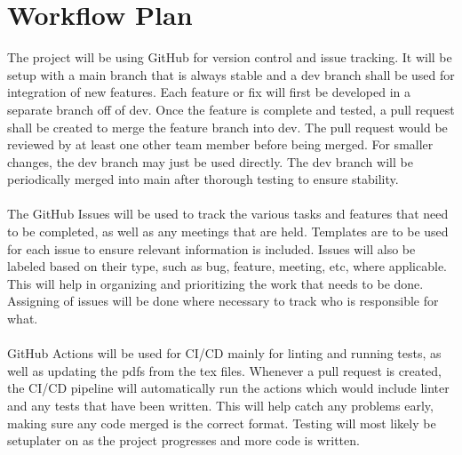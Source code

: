\documentclass{article}
\begin{document}

\section{Workflow Plan}

	
  
  The project will be using GitHub for version control and issue tracking. 
  It will be setup with a main branch that is always stable and
  a dev branch shall be used for integration of new features. Each feature 
  or fix will first be developed in a separate branch off of dev. 
  Once the feature is complete and tested, a pull request shall be created 
  to merge the feature branch into dev. The pull request would be 
  reviewed by at least one other team member before being merged. 
  For smaller changes, the dev branch may just be used directly. 
  The dev branch will be periodically merged into main after 
  thorough testing to ensure stability. 
  \\
  \\
  The GitHub Issues will be used to track the various tasks and features 
  that need to be completed, as well as any meetings that are held.
  Templates are to be used for each issue to ensure relevant 
  information is included. Issues will also be labeled based on their type, 
  such as bug, feature, meeting, etc, where applicable. This will help in 
  organizing and prioritizing the work that needs to be done. 
  Assigning of issues will be done where necessary to track who is responsible 
  for what.
  \\
  \\
  GitHub Actions will be used for CI/CD mainly for linting and running tests, 
  as well as updating the pdfs from the tex files. Whenever a pull request is 
  created, the CI/CD pipeline will automatically run the actions which would 
  include linter and any tests that have been written. This will help catch 
  any problems early, making sure any code merged is the correct format. 
  Testing will most likely be setuplater on as the project progresses and 
  more code is written.
\end{document}
